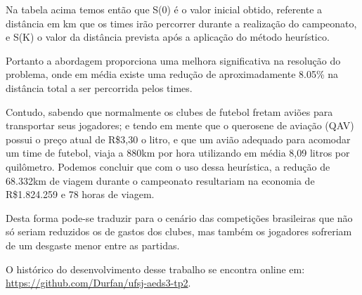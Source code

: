 \documentclass[12pt,a4paper]{article}
\numberwithin{figure}{section}
\numberwithin{table}{section}
\begin{document}
Na tabela acima temos então que S(0) é o valor inicial obtido, referente a distância em km que os times irão percorrer durante a realização do campeonato, e S(K) o valor da distância prevista após a aplicação do método heurístico. 

Portanto a abordagem proporciona uma melhora significativa na resolução do problema, onde em média existe uma redução de aproximadamente 8.05\% na distância total a ser percorrida pelos times. 

Contudo, sabendo que normalmente os clubes de futebol fretam aviões para transportar seus jogadores; e tendo em mente que o querosene de aviação (QAV)\cite{ttp:qav} possui o preço atual de R\$3,30 o litro, e que um avião adequado para acomodar um time de futebol, viaja a 880km por hora utilizando em média 8,09 litros por quilômetro\cite{ttp:rendimento}. Podemos concluir que com o uso dessa heurística, a redução de 68.332km de viagem durante o campeonato resultariam na economia de R\$1.824.259 e 78 horas de viagem. 

Desta forma pode-se traduzir para o cenário das competições brasileiras que não só seriam reduzidos os de gastos dos clubes, mas também os jogadores sofreriam de um desgaste menor entre as partidas.

\pagebreak

\begin{flushleft}
	\nocite{*}
	
	\vfill
	O histórico do desenvolvimento desse trabalho se encontra online em:\\ \url{https://github.com/Durfan/ufsj-aeds3-tp2}.
\end{flushleft}
\end{document}
